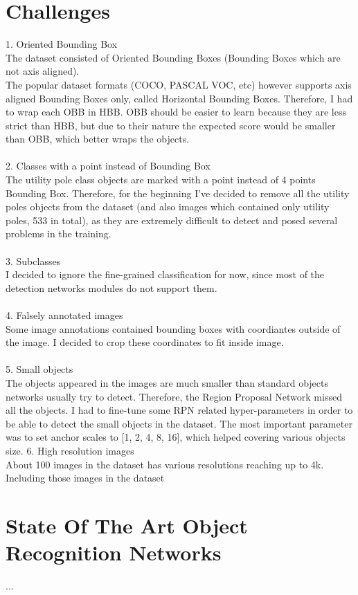 \documentclass[]{article}
\begin{document}
\section{Challenges}
1. Oriented Bounding Box \\
The dataset consisted of Oriented Bounding Boxes (Bounding Boxes which are not axis aligned). \\
The popular dataset formats (COCO, PASCAL VOC, etc) however supports axis aligned Bounding Boxes only, called Horizontal Bounding Boxes. 
Therefore, I had to wrap each OBB in HBB.  
OBB should be easier to learn because they are less strict than HBB, but due to their nature the expected score would be smaller than OBB, which better wraps the objects.
\\\\
2. Classes with a point instead of Bounding Box\\
The utility pole class objects are marked with a point instead of 4 points Bounding Box. Therefore, for the beginning I've decided to remove all the utility poles objects from the dataset (and also images which contained only utility poles, 533 in total), as they are extremely difficult to detect and posed several problems in the training.
\\\\
3. Subclasses\\
I decided to ignore the fine-grained classification for now, since most of the detection networks modules do not support them.
\\\\
4. Falsely annotated images\\
Some image annotations contained bounding boxes with coordiantes outside of the image. I decided to crop these coordinates to fit inside image.
\\\\
5. Small objects\\
The objects appeared in the images are much smaller than standard objects networks usually try to detect. Therefore, the Region Proposal Network missed all the objects. I had to fine-tune some RPN related hyper-parameters in order to be able to detect the small objects in the dataset. The most important parameter was to set anchor scales to [1, 2, 4, 8, 16], which helped covering various objects size.
6. High resolution images\\
About 100 images in the dataset has various resolutions reaching up to 4k. Including those images in the dataset 
\section{State Of The Art Object Recognition Networks}
...
\end{document}
